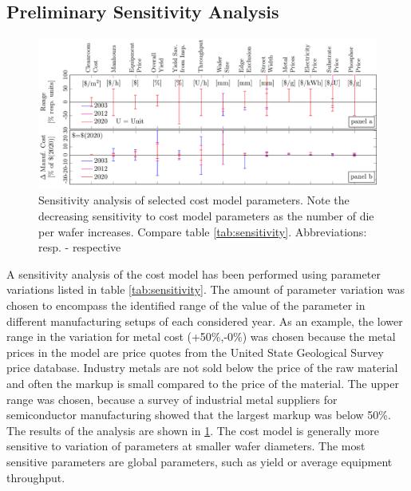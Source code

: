\documentclass[10pt]{article}
\begin{document}
\subsection{Preliminary Sensitivity Analysis}

\begin{figure}[h]
	\centering
    \includegraphics[width=\textwidth]{2_SSL_EES/article/figures/costmodel_sensitivity.pdf}
	\caption{Sensitivity analysis of selected cost model parameters. Note the decreasing sensitivity to cost model parameters as the number of die per wafer increases. Compare table \cref{tab:sensitivity}. Abbreviations: resp. - respective}
	\label{fig:sensitivity}
\end{figure}

A sensitivity analysis of the cost model has been performed using parameter variations listed in table \cref{tab:sensitivity}. The amount of parameter variation was chosen to encompass the identified range of the value of the parameter in different manufacturing setups of each considered year. As an example, the lower range in the variation for metal cost (+50\%,-0\%) was chosen because the metal prices in the model are price quotes from the United State Geological Survey price database. Industry metals are not sold below the price of the raw material and often the markup is small compared to the price of the material. The upper range was chosen, because a survey of industrial metal suppliers for semiconductor manufacturing showed that the largest markup was below 50\%. The results of the analysis are shown in  \cref{fig:sensitivity}. The cost model is generally more sensitive to variation of parameters at smaller wafer diameters. The most sensitive parameters are global parameters, such as yield or average equipment throughput.
\end{document}
